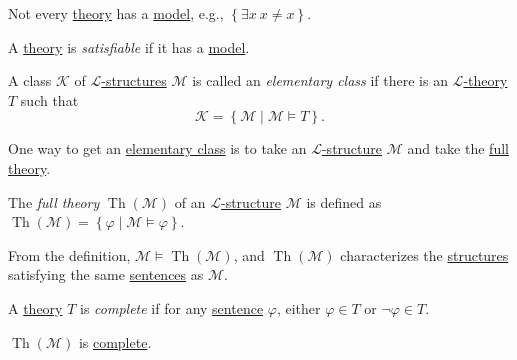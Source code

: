 \begin{note}
	Not every \hyperref[def:theory]{theory} has a \hyperref[def:model]{model}, e.g., \(\left\{ \exists x\ x \neq x \right\} \).
\end{note}

\begin{definition}[Satisfiable]\label{def:satisfiable}
	A \hyperref[def:theory]{theory} is \emph{satisfiable} if it has a \hyperref[def:model]{model}.
\end{definition}

\begin{definition}\label{def:elementary-class}
	A class \(\mathcal{K} \) of \hyperref[def:structure]{\(\mathcal{L} \)-structures} \(\mathcal{M} \) is called an \emph{elementary class} if there is an \hyperref[def:theory]{\(\mathcal{L} \)-theory} \(T\) such that
	\[
		\mathcal{K} = \left\{ \mathcal{M} \mid \mathcal{M} \models T \right\}.
	\]
\end{definition}

One way to get an \hyperref[def:elementary-class]{elementary class} is to take an \hyperref[def:structure]{\(\mathcal{L} \)-structure} \(\mathcal{M} \) and take the \hyperref[def:full-theory]{full theory}.

\begin{definition}\label{def:full-theory}
	The \emph{full theory} \(\mathop{\mathrm{Th}}(\mathcal{M} ) \) of an \hyperref[def:structure]{\(\mathcal{L} \)-structure} \(\mathcal{M} \) is defined as \(\mathop{\mathrm{Th}}(\mathcal{M} ) = \left\{ \varphi \mid \mathcal{M} \models \varphi  \right\}\).
\end{definition}

From the definition, \(\mathcal{M} \models \mathop{\mathrm{Th}}(\mathcal{M} ) \), and \(\mathop{\mathrm{Th}}(\mathcal{M} ) \) characterizes the \hyperref[def:structure]{structures} satisfying the same \hyperref[def:sentence]{sentences} as \(\mathcal{M} \).

\begin{definition}[Complete]\label{def:complete}
	A \hyperref[def:theory]{theory} \(T\) is \emph{complete} if for any \hyperref[def:sentence]{sentence} \(\varphi \), either \(\varphi \in T\) or \(\lnot \varphi \in T\).
\end{definition}

\begin{remark}
	\(\mathop{\mathrm{Th}}(\mathcal{M} ) \) is \hyperref[def:complete]{complete}.
\end{remark}

